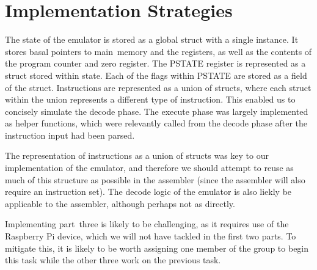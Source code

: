 \documentclass[11pt]{article}
\begin{document}
\section{Implementation Strategies}
The state of the emulator is stored as a global struct with a single instance. It stores basal pointers to 
main~memory and the registers, as well as the contents of the program counter and zero register. The PSTATE
register is represented as a struct stored within state. Each of the flags within PSTATE are stored as a field
of the struct. Instructions are represented as a union of structs, where each struct within the union represents
a different type of instruction. This enabled us to concisely simulate the decode phase. The execute phase was
largely implemented as helper functions, which were relevantly called from the decode phase after the instruction
input had been parsed. 

The representation of instructions as a union of structs was key to our implementation of the emulator, and
therefore we should attempt to reuse as much of this structure as possible in the assembler (since the assembler
will also require an instruction set). The decode logic of the emulator is also liekly be applicable to the assembler,
although perhaps not as directly.

Implementing part~three is likely to be challenging, as it requires use of the Raspberry Pi device, which we
will not have tackled in the first two parts. To mitigate this, it is likely to be worth assigning one member
of the group to begin this task while the other three work on the previous task. 
\end{document}
